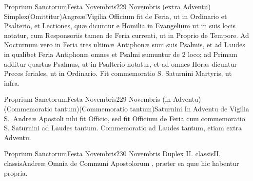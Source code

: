 \documentclass[nocturnale-romanum.tex]{subfiles}
\begin{document}
	{Proprium Sanctorum}{Festa Novembris}{2}{29 Novembris (extra Adventu)}
	{Simplex}{(Omittitur)}{Angreæ!Vigilia}
	{Officium fit de Feria, ut in Ordinario et Psalterio, et Lectiones, quæ dicuntur e Homilia in Evangelium  ut in suis locis notatur, cum Responsoriis tamen de Feria currenti, ut in Proprio de Tempore. Ad Nocturnum vero in Feria  tres ultimæ Antiphonæ sum suis Psalmis, et ad Laudes in qualibet Feria Antiphonæ omnes et Psalmi sumuntur de 2 loco; ad Primam additur quartus Psalmus, ut in Psalterio notatur, et ad omnes Horas dicuntur Preces feriales, ut in Ordinario.}
	{Fit commemoratio S. Saturnini Martyris, ut infra.}

	{Proprium Sanctorum}{Festa Novembris}{2}{29 Novembris (in Adventu)}
	{(Commemoratio tantum)}{(Commemoratio tantum)}{Saturnini}
	{In Adventu de Vigilia S.\ Andreæ Apostoli nihi fit Officio, sed fit Officium de Feria cum commemoratio S. Saturnini ad Laudes tantum.}
	{Commemoratio ad Laudes tantum, etiam extra Adventu.}

	{Proprium Sanctorum}{Festa Novembris}{2}{30 Novembris}
	{Duplex II. classis}{II. classis}{Andreæ}
	{Omnia de Communi Apostolorum \pageref{M-APEX}, præter ea quæ hic habentur propria.}
	{}
\tedeumrubric
\end{document}
